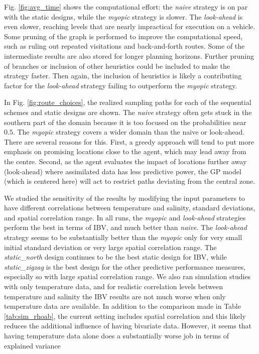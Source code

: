 \documentclass[aoas]{imsart}
\begin{document}
Fig. \ref{fig:avg_time} shows the computational effort: the
\textit{naive} strategy is on par with the static designs, while the
\textit{myopic} strategy is slower. The \textit{look-ahead} is even
slower, reaching levels that are nearly impractical for execution on a
vehicle. Some pruning of the graph is performed to improve the
computational speed, such as ruling out repeated visitations and
back-and-forth routes. Some of the intermediate results are also
stored for longer planning horizons. Further pruning of branches or
inclusion of other heuristics could be included to make the strategy
faster. Then again, the inclusion of heuristics is likely a
contributing factor for the \textit{look-ahead} strategy failing to
outperform the \textit{myopic} strategy.

In Fig. \ref{fig:route_choices}, the realized sampling paths for each
of the sequential schemes and static designs are shown. The
\textit{naive} strategy often gets stuck in the southern part of the
domain because it is too focused on the probabilities near $0.5$. The
\textit{myopic} strategy covers a wider domain than the naive or
look-ahead. There are several reasons for this. First, a greedy
approach will tend to put more emphasis on promising locations close to the
agent, which may lead away from the centre. Second, as the agent
evaluates the impact of locations further away (look-ahead) where
assimilated data has less predictive power, the GP model (which
is centered here) will act to restrict paths deviating from the
central zone.

We studied the sensitivity of the results by modifying the input parameters to have different correlations between temperature and salinity, standard deviations, and spatial correlation range.  In all runs,  the \textit{myopic} and \textit{look-ahead} strategies perform the best in terms of IBV, and much better than \textit{naive}. The \textit{look-ahead} strategy seems to be substantially better than the \textit{myopic} only for very small initial standard deviation or very large spatial correlation range. The \textit{static\_north} design continues to be the best static design for IBV, while \textit{static\_zigzag} is the best design for the other predictive performance measures, especially so with large spatial correlation range. We also ran simulation studies with only temperature data, and for realistic correlation levels between temperature and salinity the IBV results are not much worse when only temperature data are available. In addition to the comparison made in Table \ref{tab:sim_rhoab}, the current setting includes spatial correlation and this likely reduces the additional influence of having bivariate data. However, it seems that having temperature data alone does a substantially worse job in terms of explained variance
\end{document}
